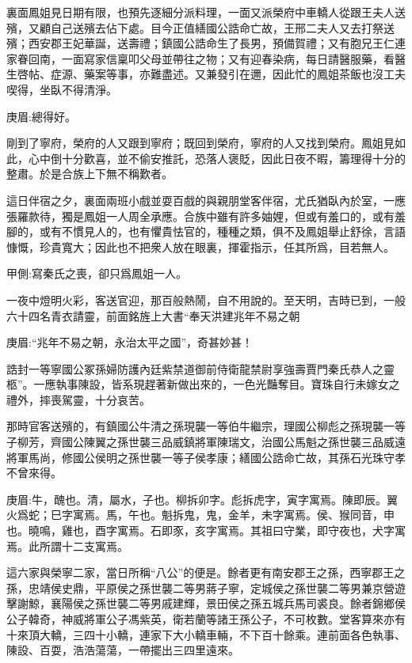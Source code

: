 \begin{parag}
    裏面鳳姐見日期有限，也預先逐細分派料理，一面又派榮府中車轎人從跟王夫人送殯，又顧自己送殯去佔下處。目今正值繕國公誥命亡故，王邢二夫人又去打祭送殯；西安郡王妃華誕，送壽禮；鎮國公誥命生了長男，預備賀禮；又有胞兄王仁連家眷回南，一面寫家信稟叩父母並帶往之物；又有迎春染病，每日請醫服藥，看醫生啓帖、症源、藥案等事，亦難盡述。又兼發引在邇，因此忙的鳳姐茶飯也沒工夫喫得，坐臥不得清淨。\begin{note}庚眉:總得好。\end{note}剛到了寧府，榮府的人又跟到寧府；既回到榮府，寧府的人又找到榮府。鳳姐見如此，心中倒十分歡喜，並不偷安推託，恐落人褒貶，因此日夜不暇，籌理得十分的整肅。於是合族上下無不稱歎者。
\end{parag}


\begin{parag}
    這日伴宿之夕，裏面兩班小戲並耍百戲的與親朋堂客伴宿，尤氏猶臥內於室，一應張羅款待，獨是鳳姐一人周全承應。合族中雖有許多妯娌，但或有羞口的，或有羞腳的，或有不慣見人的，也有懼貴怯官的，種種之類，俱不及鳳姐舉止舒徐，言語慷慨，珍貴寬大；因此也不把衆人放在眼裏，揮霍指示，任其所爲，目若無人。\begin{note}甲側:寫秦氏之喪，卻只爲鳳姐一人。\end{note}一夜中燈明火彩，客送官迎，那百般熱鬧，自不用說的。至天明，吉時已到，一般六十四名青衣請靈，前面銘旌上大書“奉天洪建兆年不易之朝\begin{note}庚眉:“兆年不易之朝，永治太平之國”，奇甚妙甚！\end{note}誥封一等寧國公冢孫婦防護內廷紫禁道御前侍衛龍禁尉享強壽賈門秦氏恭人之靈柩”。一應執事陳設，皆系現趕著新做出來的，一色光豔奪目。寶珠自行未嫁女之禮外，摔喪駕靈，十分哀苦。
\end{parag}


\begin{parag}
    那時官客送殯的，有鎮國公牛清之孫現襲一等伯牛繼宗，理國公柳彪之孫現襲一等子柳芳，齊國公陳翼之孫世襲三品威鎮將軍陳瑞文，治國公馬魁之孫世襲三品威遠將軍馬尚，修國公侯明之孫世襲一等子侯孝康；繕國公誥命亡故，其孫石光珠守孝不曾來得。\begin{note}庚眉:牛，醜也。清，屬水，子也。柳拆卯字。彪拆虎字，寅字寓焉。陳即辰。翼火爲蛇；巳字寓焉。馬，午也。魁拆鬼，鬼，金羊，未字寓焉。侯、猴同音，申也。曉鳴，雞也，酉字寓焉。石即豕，亥字寓焉。其祖曰守業，即守夜也，犬字寓焉。此所謂十二支寓焉。\end{note}這六家與榮寧二家，當日所稱“八公”的便是。餘者更有南安郡王之孫，西寧郡王之孫，忠靖侯史鼎，平原侯之孫世襲二等男蔣子寧，定城侯之孫世襲二等男兼京營遊擊謝鯨，襄陽侯之孫世襲二等男戚建輝，景田侯之孫五城兵馬司裘良。餘者錦鄉侯公子韓奇，神威將軍公子馮紫英，衛若蘭等諸王孫公子，不可枚數。堂客算來亦有十來頂大轎，三四十小轎，連家下大小轎車輛，不下百十餘乘。連前面各色執事、陳設、百耍，浩浩蕩蕩，一帶擺出三四里遠來。
\end{parag}


